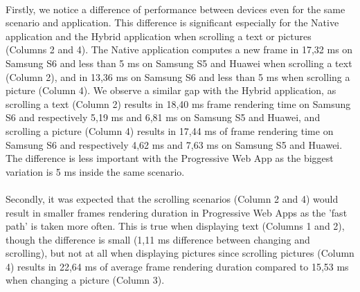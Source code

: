 \documentclass{kththesis}
\begin{document}
\paragraph{}
Firstly, we notice a difference of performance between devices even for the same scenario and application. This difference is significant especially for the Native application and the Hybrid application when scrolling a text or pictures (Columns 2 and 4). The Native application computes a new frame in 17,32 ms on Samsung S6 and less than 5 ms on Samsung S5 and Huawei when scrolling a text (Column 2), and in 13,36 ms on Samsung S6 and less than 5 ms when scrolling a picture (Column 4). We observe a similar gap with the Hybrid application, as scrolling a text (Column 2) results in 18,40 ms frame rendering time on Samsung S6 and respectively 5,19 ms and 6,81 ms on Samsung S5 and Huawei, and scrolling a picture (Column 4) results in 17,44 ms of frame rendering time on Samsung S6 and respectively 4,62 ms and 7,63 ms on Samsung S5 and Huawei. \newline
The difference is less important with the Progressive Web App as the biggest variation is 5 ms inside the same scenario. 


\paragraph{}
Secondly, it was expected that the scrolling scenarios (Column 2 and 4) would result in smaller frames rendering duration in Progressive Web Apps as the 'fast path' is taken more often. This is true when displaying text (Columns 1 and 2), though the difference is small (1,11 ms difference between changing and scrolling), but not at all when displaying pictures since scrolling pictures (Column 4) results in 22,64 ms of average frame rendering duration compared to 15,53 ms when changing a picture (Column 3). 
\end{document}
